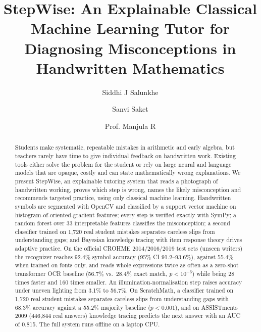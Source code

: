\documentclass[runningheads]{llncs}
\begin{document}
\title{StepWise: An Explainable Classical Machine Learning Tutor for Diagnosing Misconceptions in Handwritten Mathematics}

\author{Siddhi J Salunkhe \and Sanvi Saket \and Prof. Manjula R}


\maketitle

\begin{abstract}
Students make systematic, repeatable mistakes in arithmetic and early algebra, but teachers rarely have time to give individual feedback on handwritten work. Existing tools either solve the problem for the student or rely on large neural and language models that are opaque, costly and can state mathematically wrong explanations. We present StepWise, an explainable tutoring system that reads a photograph of handwritten working, proves which step is wrong, names the likely misconception and recommends targeted practice, using only classical machine learning. Handwritten symbols are segmented with OpenCV and classified by a support vector machine on histogram-of-oriented-gradient features; every step is verified exactly with SymPy; a random forest over 33 interpretable features classifies the misconception; a second classifier trained on 1,720 real student mistakes separates careless slips from understanding gaps; and Bayesian knowledge tracing with item response theory drives adaptive practice. On the official CROHME 2014/2016/2019 test sets (unseen writers) the recognizer reaches 92.4\% symbol accuracy (95\% CI 91.2--93.6\%), against 55.4\% when trained on fonts only, and reads whole expressions twice as often as a zero-shot transformer OCR baseline (56.7\% vs.\ 28.4\% exact match, $p<10^{-6}$) while being 28 times faster and 160 times smaller. An illumination-normalisation step raises accuracy under uneven lighting from 3.1\% to 56.7\%. On ScratchMath, a classifier trained on 1,720 real student mistakes separates careless slips from understanding gaps with 68.3\% accuracy against a 55.2\% majority baseline ($p<0.001$), and on ASSISTments 2009 (446,844 real answers) knowledge tracing predicts the next answer with an AUC of 0.815. The full system runs offline on a laptop CPU.

\end{abstract}
\end{document}
